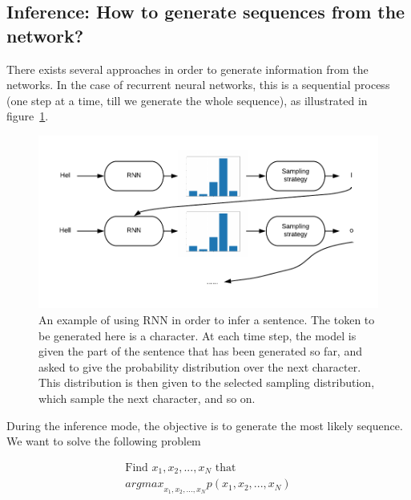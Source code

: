 


\subsection{Inference: How to generate sequences from the network?}
\par There exists several approaches in order to generate information from the networks. In the case of recurrent neural networks, this is a sequential process (one step at a time, till we generate the whole sequence), as illustrated in figure~\ref{fig:text_gen}.

\begin{figure}
    \centering
    \includegraphics{images/gbem/text_gen.png}
    \caption{An example of using RNN in order to infer a sentence. The token to be generated here is a character. At each time step, the model is given the part of the sentence that has been generated so far, and asked to give the probability distribution over the next character. This distribution is then given to the selected sampling distribution, which sample the next character, and so on.}
    \label{fig:text_gen}
\end{figure}

During the inference mode, the objective is to generate the most likely sequence. We want to solve the following problem

\begin{equation}
    \begin{split}
    \textrm{Find $x_1, x_2, ..., x_N$ that }\\
    {argmax}_{x_1, x_2, ..., x_N}p(x_1, x_2, ..., x_N)
    \label{eq:rnn_obj_inf}
    \end{split}
\end{equation}


